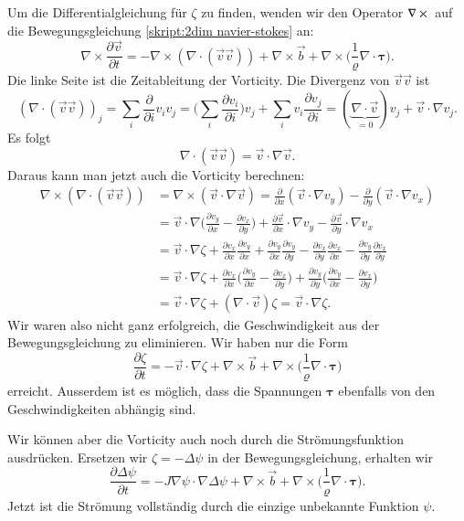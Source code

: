 Um die Differentialgleichung für $\zeta$ zu finden, wenden wir den
Operator $\nabla\times\mathstrut$ auf die Bewegungsgleichung
\eqref{skript:2dim navier-stokes}
an:
\[
\nabla\times\frac{\partial \vec{v}}{\partial t}
=
-\nabla\times(\nabla\cdot(\vec{v}\vec{v}))+\nabla\times\vec b + \nabla\times\biggl(\frac1{\varrho}\nabla\cdot\bm{\tau}\biggr).
\]
Die linke Seite ist die Zeitableitung der Vorticity.
Die Divergenz von $\vec{v}\vec{v}$ ist 
\[
(\nabla\cdot(\vec{v}\vec{v}))_j
=
\sum_i \frac{\partial}{\partial i}v_iv_j
=
\biggl(\sum_i \frac{\partial v_i}{\partial i}\biggr)v_j
+
\sum_i v_i\frac{\partial v_j}{\partial i}
=
(\underbrace{\nabla\cdot\vec{v}}_{\displaystyle=0})v_j
+
\vec{v}\cdot\nabla v_j.
\]
Es folgt
\[
\nabla\cdot(\vec{v}\vec{v})
=
\vec{v}\cdot\nabla \vec{v}.
\]
Daraus kann man jetzt auch die Vorticity berechnen:
\begin{align*}
\nabla\times(\nabla\cdot(\vec{v}\vec{v}))
&=
\nabla\times(\vec{v}\cdot\nabla\vec{v})
=
\frac{\partial}{\partial x}(\vec{v}\cdot\nabla v_y)
-
\frac{\partial}{\partial y}(\vec{v}\cdot\nabla v_x)
\\
&=
\vec{v}\cdot\nabla
\biggl(\frac{\partial v_y}{\partial x}-\frac{\partial v_x}{\partial y}\biggr)
+
\frac{\partial\vec{v}}{\partial x} \cdot\nabla v_y
-
\frac{\partial\vec{v}}{\partial y} \cdot\nabla v_x
\\
&=
\vec{v}\cdot\nabla\zeta
+
\frac{\partial v_x}{\partial x} \frac{\partial v_y}{\partial x}
+
\frac{\partial v_y}{\partial x} \frac{\partial v_y}{\partial y}
-
\frac{\partial v_x}{\partial y} \frac{\partial v_x}{\partial x}
-
\frac{\partial v_y}{\partial y} \frac{\partial v_x}{\partial y}
\\
&=
\vec{v}\cdot\nabla\zeta
+
\frac{\partial v_x}{\partial x}
\biggl(\frac{\partial v_y}{\partial x}-\frac{\partial v_x}{\partial y}\biggr)
+
\frac{\partial v_y}{\partial y}
\biggl(\frac{\partial v_y}{\partial x}-\frac{\partial v_x}{\partial y}\biggr)
\\
&=
\vec{v}\cdot\nabla\zeta
+
(\nabla\cdot\vec{v})\zeta
=
\vec{v}\cdot\nabla\zeta.
\end{align*}
Wir waren also nicht ganz erfolgreich, die Geschwindigkeit aus der
Bewegungsgleichung zu eliminieren.
Wir haben nur die Form
\[
\frac{\partial \zeta}{\partial t}
=
-\vec{v}\cdot\nabla\zeta
+\nabla\times\vec b
+ \nabla\times\biggl(\frac1{\varrho}\nabla\cdot\bm{\tau}\biggr)
\]
erreicht.
Ausserdem ist es möglich, dass die Spannungen $\bm{\tau}$ ebenfalls von
den Geschwindigkeiten abhängig sind.

Wir können aber die Vorticity auch noch durch die Strömungsfunktion
ausdrücken.
Ersetzen wir $\zeta=-\Delta\psi$ in der Bewegungsgleichung, erhalten
wir
\begin{equation}
\frac{\partial \Delta \psi}{\partial t}
=
-J\nabla\psi\cdot\nabla\Delta\psi
+\nabla\times\vec b
+ \nabla\times\biggl(\frac1{\varrho}\nabla\cdot\bm{\tau}\biggr).
\label{skript:voritictyequation}
\end{equation}
Jetzt ist die Strömung vollständig durch die einzige unbekannte Funktion 
$\psi$.


